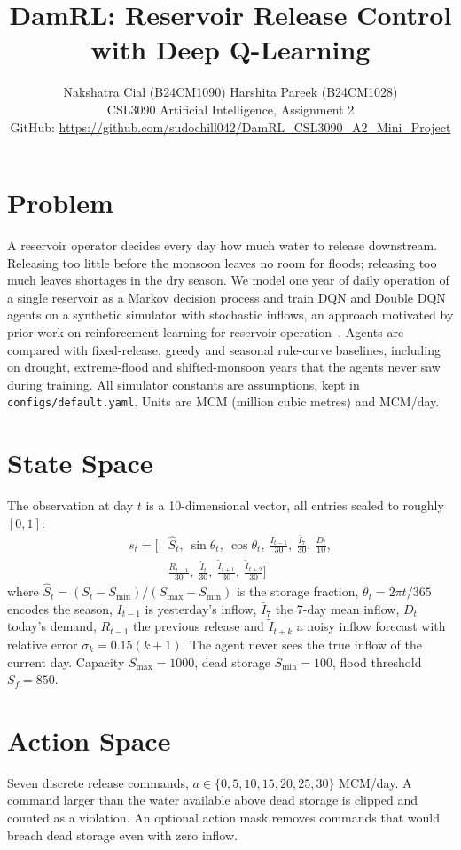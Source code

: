 \documentclass[10pt,twocolumn]{article}
\title{\vspace{-14pt}\textbf{DamRL: Reservoir Release Control with Deep Q-Learning}\vspace{-6pt}}
\author{
  Nakshatra Cial (B24CM1090) \quad Harshita Pareek (B24CM1028)\\
  \small CSL3090 Artificial Intelligence, Assignment 2\\
  \small GitHub: \url{https://github.com/sudochill042/DamRL_CSL3090_A2_Mini_Project}
  \vspace{-10pt}
}
\date{}
\begin{document}
\maketitle

\section{Problem}
A reservoir operator decides every day how much water to release downstream. Releasing too little before the monsoon leaves no room for floods; releasing too much leaves shortages in the dry season. We model one year of daily operation of a single reservoir as a Markov decision process and train DQN and Double DQN agents on a synthetic simulator with stochastic inflows, an approach motivated by prior work on reinforcement learning for reservoir operation~\cite{wang2020,bertoni2020}. Agents are compared with fixed-release, greedy and seasonal rule-curve baselines, including on drought, extreme-flood and shifted-monsoon years that the agents never saw during training. All simulator constants are assumptions, kept in \texttt{configs/default.yaml}. Units are MCM (million cubic metres) and MCM/day.

\section{State Space}
The observation at day $t$ is a 10-dimensional vector, all entries scaled to roughly $[0,1]$:
\begin{align*}
s_t = \big[&\hat S_t,\ \sin\theta_t,\ \cos\theta_t,\ \tfrac{I_{t-1}}{30},\ \tfrac{\bar I_{7}}{30},\ \tfrac{D_t}{10},\\
           &\tfrac{R_{t-1}}{30},\ \tfrac{\tilde I_{t}}{30},\ \tfrac{\tilde I_{t+1}}{30},\ \tfrac{\tilde I_{t+2}}{30}\big]
\end{align*}
where $\hat S_t=(S_t-S_{\min})/(S_{\max}-S_{\min})$ is the storage fraction, $\theta_t=2\pi t/365$ encodes the season, $I_{t-1}$ is yesterday's inflow, $\bar I_7$ the 7-day mean inflow, $D_t$ today's demand, $R_{t-1}$ the previous release and $\tilde I_{t+k}$ a noisy inflow forecast with relative error $\sigma_k=0.15(k+1)$. The agent never sees the true inflow of the current day. Capacity $S_{\max}=1000$, dead storage $S_{\min}=100$, flood threshold $S_f=850$.

\section{Action Space}
Seven discrete release commands, $a\in\{0,5,10,15,20,25,30\}$ MCM/day. A command larger than the water available above dead storage is clipped and counted as a violation. An optional action mask removes commands that would breach dead storage even with zero inflow.
\end{document}
